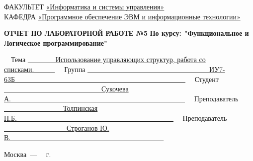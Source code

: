 \begin{titlepage}
{	{\doublespacing \small \raggedright ФАКУЛЬТЕТ \hspace{5mm} \underline{«Информатика и системы управления»}\\
	КАФЕДРА \hspace{10mm} \underline{«Программное обеспечение ЭВМ и информационные технологии»}\\}

	\vspace{20mm}

	\begin{center}
		\noindent\begin{minipage}{1.2\textwidth}\centering
			\textbf{ОТЧЕТ ПО ЛАБОРАТОРНОЙ РАБОТЕ №5}\newline
			\textbf{По курсу: "Функциональное и Логическое программирование"}\newline\newline\newline
		\end{minipage}
	\end{center}

	\vspace{20mm}

	\noindent ~~Тема \underline{~~~~~~~~Использование управляющих структур, работа со списками.~~~~~~}\newline
	\noindent ~~Группа \underline{~~~~~~~~~~~~~~~~~~~~~~~~~~~~~~~~~~~ИУ7-63Б~~~~~~~~~~~~~~~~~~~~~~~~~~~~~~~~~~~~~~~~~~~~~~~~~}\newline
	\noindent ~~Студент \underline{~~~~~~~~~~~~~~~~~~~~~~~~~~~~Сукочева А.~~~~~~~~~~~~~~~~~~~~~~~~~~~~~~~~~~~~~~~~~~~~~~~~~~}\newline
	\noindent ~~Преподаватель \underline{~~~~~~~~~~~~~~~~~Толпинская Н.Б.~~~~~~~~~~~~~~~~~~~~~~~~~~~~~~~~~~~~~~~~~~~~~}\newline
	\noindent ~~Преподаватель \underline{~~~~~~~~~~~~~~~~~~Строганов Ю. В.~~~~~~~~~~~~~~~~~~~~~~~~~~~~~~~~~~~~~~~~~~~~}\newline


	\begin{center}
		\vfill
		Москва~---~\the\year
		~г.
	\end{center}
	}



\end{titlepage}

\setcounter{page}{2}